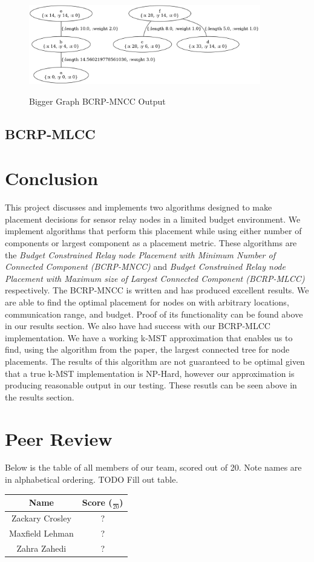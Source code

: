 \documentclass{article}
\begin{document}
\begin{figure}[h]
\centering
\includegraphics[width=0.9\textwidth]{examples/loc3_alg4.png}
\label{loc3_alg4}
\caption{Bigger Graph BCRP-MNCC Output}
\end{figure}


\subsection{BCRP-MLCC}



\section{Conclusion}
This project discusses and implements two algorithms designed to make placement decisions for sensor relay nodes in a limited budget environment.
We implement algorithms that perform this placement while using either number of components or largest component as a placement metric.
These algorithms are the \textit{Budget Constrained Relay node Placement with Minimum Number of Connected Component (BCRP-MNCC)} and \textit{Budget Constrained Relay node Placement with Maximum size of Largest Connected Component (BCRP-MLCC)} respectively.
The BCRP-MNCC is written and has produced excellent results.
We are able to find the optimal placement for nodes on with arbitrary locations, communication range, and budget.
Proof of its functionality can be found above in our results section.
We also have had success with our BCRP-MLCC implementation.
We have a working k-MST approximation that enables us to find, using the algorithm from the paper, the largest connected tree for node placements.
The results of this algorithm are not guaranteed to be optimal given that a true k-MST implementation is NP-Hard, however our approximation is producing reasonable output in our testing.
These resutls can be seen above in the results section.

\section{Peer Review}
Below is the table of all members of our team, scored out of 20.
Note names are in alphabetical ordering.
TODO Fill out table.
\begin{center}
  \begin{tabular}{|c|c|}
     \hline
  Name & Score ($\frac{}{20}$)\\
   \hline
  Zackary Crosley & ? \\
   \hline
  Maxfield Lehman & ?\\
   \hline
  Zahra Zahedi & ?\\
                  \hline
\end{tabular}
\end{center}
\end{document}
